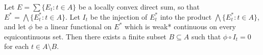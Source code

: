 Let $E = \sum \{E_t : t \in A\}$ be a locally convex direct sum, so that $E^* = \bigwedge \{E_t^* : t \in A\}$. Let $I_t$ be the injection of $E_t^*$ into the product $\bigwedge \{E_t^* : t \in A\}$, and let $\phi$ be a linear functional on $E^*$ which is weak* continuous on every equicontinuous set. Then there exists a finite subset $B \subseteq A$ such that $\phi \circ I_t = 0$ for each $t \in A \setminus B$.
